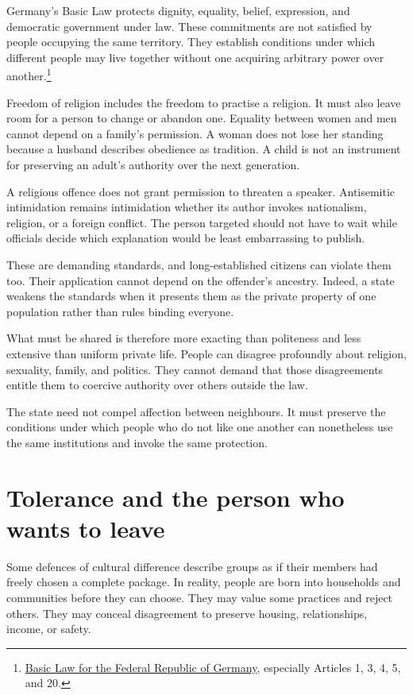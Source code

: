 \documentclass[12pt,a4paper]{book}
\begin{document}
Germany's Basic Law protects dignity, equality, belief, expression, and democratic government under law. These commitments are not satisfied by people occupying the same territory. They establish conditions under which different people may live together without one acquiring arbitrary power over another.\footnote{\href{https://www.gesetze-im-internet.de/englisch_gg/}{Basic Law for the Federal Republic of Germany}, especially Articles 1, 3, 4, 5, and 20.}

Freedom of religion includes the freedom to practise a religion. It must also leave room for a person to change or abandon one. Equality between women and men cannot depend on a family's permission. A woman does not lose her standing because a husband describes obedience as tradition. A child is not an instrument for preserving an adult's authority over the next generation.

A religious offence does not grant permission to threaten a speaker. Antisemitic intimidation remains intimidation whether its author invokes nationalism, religion, or a foreign conflict. The person targeted should not have to wait while officials decide which explanation would be least embarrassing to publish.

These are demanding standards, and long-established citizens can violate them too. Their application cannot depend on the offender's ancestry. Indeed, a state weakens the standards when it presents them as the private property of one population rather than rules binding everyone.

What must be shared is therefore more exacting than politeness and less extensive than uniform private life. People can disagree profoundly about religion, sexuality, family, and politics. They cannot demand that those disagreements entitle them to coercive authority over others outside the law.

The state need not compel affection between neighbours. It must preserve the conditions under which people who do not like one another can nonetheless use the same institutions and invoke the same protection.

\section*{Tolerance and the person who wants to leave}

Some defences of cultural difference describe groups as if their members had freely chosen a complete package. In reality, people are born into households and communities before they can choose. They may value some practices and reject others. They may conceal disagreement to preserve housing, relationships, income, or safety.
\end{document}

